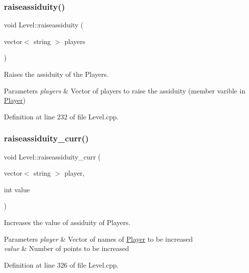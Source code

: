 \subsubsection{\texorpdfstring{raiseassiduity()}{raiseassiduity()}}
{\footnotesize\ttfamily void Level\+::raiseassiduity (\begin{DoxyParamCaption}\item[{vector$<$ string $>$}]{players }\end{DoxyParamCaption})}



Raises the assiduity of the Players. 


\begin{DoxyParams}{Parameters}
{\em players} & Vector of players to raise the assiduity (member varible in \hyperlink{class_player}{Player}) \\
\hline
\end{DoxyParams}


Definition at line 232 of file Level.\+cpp.

\hypertarget{class_level_a2634c6743f1a56592c97e6cfb7a9a8b6}{}\label{class_level_a2634c6743f1a56592c97e6cfb7a9a8b6} 
\subsubsection{\texorpdfstring{raiseassiduity\+\_\+curr()}{raiseassiduity\_curr()}}
{\footnotesize\ttfamily void Level\+::raiseassiduity\+\_\+curr (\begin{DoxyParamCaption}\item[{vector$<$ string $>$}]{player,  }\item[{int}]{value }\end{DoxyParamCaption})}



Increases the value of assiduity of Players. 


\begin{DoxyParams}{Parameters}
{\em player} & Vector of names of \hyperlink{class_player}{Player} to be increased \\
\hline
{\em value} & Number of points to be increased \\
\hline
\end{DoxyParams}


Definition at line 326 of file Level.\+cpp.

\hypertarget{class_level_af91bf73255a171a3f2a256778e075fb7}{}\label{class_level_af91bf73255a171a3f2a256778e075fb7} 
